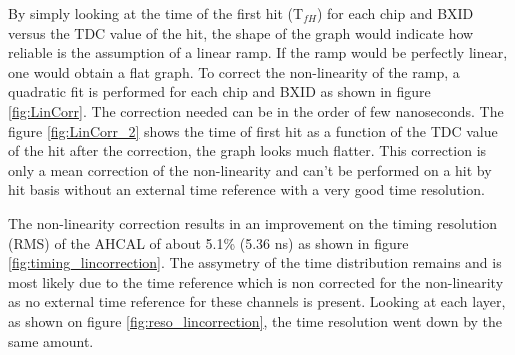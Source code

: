 By simply looking at the time of the first hit (T$_{fH}$) for each chip and BXID versus the TDC value of the hit, the shape of the graph would indicate how reliable is the assumption of a linear ramp. If the ramp would be perfectly linear, one would obtain a flat graph. To correct the non-linearity of the ramp, a quadratic fit is performed for each chip and BXID as shown in figure \ref{fig:LinCorr}. The correction needed can be in the order of few nanoseconds. The figure \ref{fig:LinCorr_2} shows the time of first hit as a function of the TDC value of the hit after the correction, the graph looks much flatter. This correction is only a mean correction of the non-linearity and can't be performed on a hit by hit basis without an external time reference with a very good time resolution.

The non-linearity correction results in an improvement on the timing resolution (RMS) of the AHCAL of about 5.1\% (5.36 ns) as shown in figure \ref{fig:timing_lincorrection}. The assymetry of the time distribution remains and is most likely due to the time reference which is non corrected for the non-linearity as no external time reference for these channels is present. Looking at each layer, as shown on figure \ref{fig:reso_lincorrection}, the time resolution went down by the same amount.

